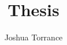 \documentclass[11pt]{report}
\begin{document}
\title{Thesis}

\author{Joshua Torrance}

\maketitle


\end{document}
